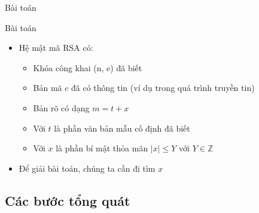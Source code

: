 \begin{frame}{Bài toán}

\begin{block}{Bài toán}
\begin{itemize}
\item Hệ mật mã RSA có:

\begin{itemize}
\item Khóa công khai (n, e) đã biết
\item Bản mã $c$ đã có thông tin (ví dụ trong quá trình truyền tin)
\item Bản rõ có dạng $m = t + x$
\item Với $t$ là phần văn bản mẫu cố định đã biết
\item Với $x$ là phần bí mật thỏa mãn $|x| \leq Y$ với \(Y \in \mathbb{Z} \)
\end{itemize}
\item Để giải bài toán, chúng ta cần đi tìm $x$
\end{itemize}

\end{block}

\end{frame}
\subsection{Các bước tổng quát}


